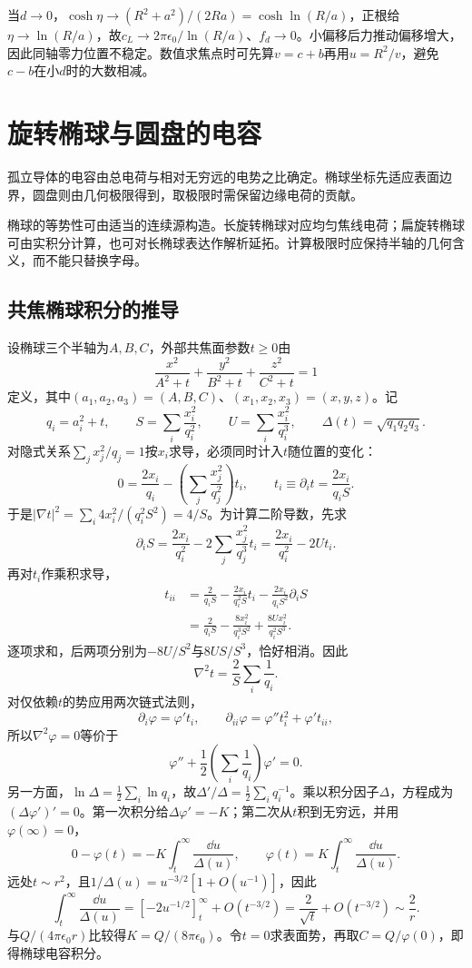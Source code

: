 \begin{solution}
当$d\to0$，$\cosh\eta\to(R^2+a^2)/(2Ra)=\cosh\ln(R/a)$，正根给$\eta\to\ln(R/a)$，故$c_{\!L}\to2\pi\epsilon_0/\ln(R/a)$、$f_d\to0$。小偏移后力推动偏移增大，因此同轴零力位置不稳定。数值求焦点时可先算$v=c+b$再用$u=R^2/v$，避免$c-b$在小$d$时的大数相减。
\end{solution}

\section{旋转椭球与圆盘的电容}\label{sec:es3-ellipsoid}
孤立导体的电容由总电荷与相对无穷远的电势之比确定。椭球坐标先适应表面边界，圆盘则由几何极限得到，取极限时需保留边缘电荷的贡献。

椭球的等势性可由适当的连续源构造。长旋转椭球对应均匀焦线电荷；扁旋转椭球可由实积分计算，也可对长椭球表达作解析延拓。计算极限时应保持半轴的几何含义，而不能只替换字母。

\subsection{共焦椭球积分的推导}\label{sec:es3-confocal}
设椭球三个半轴为$A,B,C$，外部共焦面参数$t\ge0$由
\[\frac{x^2}{A^2+t}+\frac{y^2}{B^2+t}+\frac{z^2}{C^2+t}=1
\]
定义，其中$(a_1,a_2,a_3)=(A,B,C)$、$(x_1,x_2,x_3)=(x,y,z)$。记
\[q_i=a_i^2+t,\qquad S=\sum_i\frac{x_i^2}{q_i^2},\qquad
U=\sum_i\frac{x_i^2}{q_i^3},\qquad \Delta(t)=\sqrt{q_1q_2q_3}.\]
对隐式关系$\sum_jx_j^2/q_j=1$按$x_i$求导，必须同时计入$t$随位置的变化：
\[0=\frac{2x_i}{q_i}-\left(\sum_j\frac{x_j^2}{q_j^2}\right)t_i,
\qquad t_i\equiv\partial_it=\frac{2x_i}{q_iS}.\]
于是$|\nabla t|^2=\sum_i4x_i^2/(q_i^2S^2)=4/S$。为计算二阶导数，先求
\[\partial_iS=\frac{2x_i}{q_i^2}-2\sum_j\frac{x_j^2}{q_j^3}t_i
=\frac{2x_i}{q_i^2}-2Ut_i.\]
再对$t_i$作乘积求导，
\[\begin{aligned}
t_{ii}&=\frac2{q_iS}-\frac{2x_i}{q_i^2S}t_i
-\frac{2x_i}{q_iS^2}\partial_iS\\
&=\frac2{q_iS}-\frac{8x_i^2}{q_i^3S^2}
+\frac{8Ux_i^2}{q_i^2S^3}.
\end{aligned}\]
逐项求和，后两项分别为$-8U/S^2$与$8US/S^3$，恰好相消。因此
\[\nabla^2t=\frac2S\sum_i\frac1{q_i}.\]
对仅依赖$t$的势应用两次链式法则，
\[\partial_i\varphi=\varphi't_i,\qquad
\partial_{ii}\varphi=\varphi''t_i^2+\varphi't_{ii},\]
所以$\nabla^2\varphi=0$等价于
\[\varphi''+\frac12\left(\sum_i\frac1{q_i}\right)\varphi'=0.\]
另一方面，$\ln\Delta=\tfrac12\sum_i\ln q_i$，故$\Delta'/\Delta=\tfrac12\sum_iq_i^{-1}$。乘以积分因子$\Delta$，方程成为$(\Delta\varphi')'=0$。第一次积分给$\Delta\varphi'=-K$；第二次从$t$积到无穷远，并用$\varphi(\infty)=0$，
\[0-\varphi(t)=-K\int_t^\infty\frac{\dd u}{\Delta(u)},\qquad
\varphi(t)=K\int_t^\infty\frac{\dd u}{\Delta(u)}.\]
远处$t\sim r^2$，且$1/\Delta(u)=u^{-3/2}[1+O(u^{-1})]$，因此
\[\int_t^\infty\frac{\dd u}{\Delta(u)}
=[-2u^{-1/2}]_t^\infty+O(t^{-3/2})
=\frac2{\sqrt t}+O(t^{-3/2})\sim\frac2r.\]
与$Q/(4\pi\epsilon_0r)$比较得$K=Q/(8\pi\epsilon_0)$。令$t=0$求表面势，再取$C=Q/\varphi(0)$，即得椭球电容积分。

